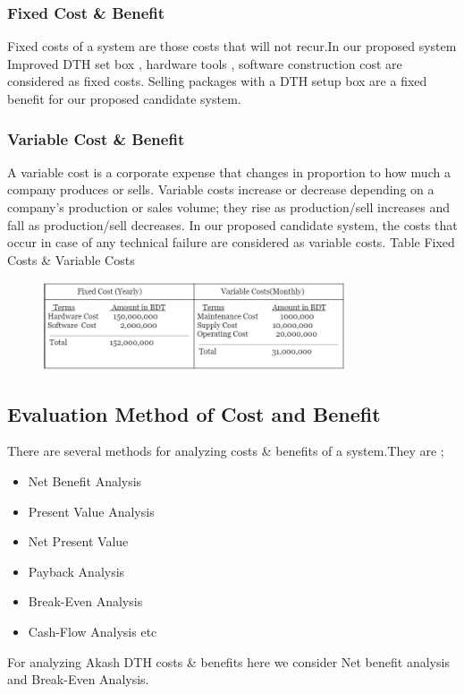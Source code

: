 \begin{spacing}{1}
\subsubsection {Fixed Cost \& Benefit}
Fixed costs of a system are those costs that will not recur.In our proposed system Improved DTH set box , hardware tools , software construction cost are considered as fixed costs. Selling packages with a DTH setup box are a fixed benefit for our proposed candidate system. 

\subsubsection {Variable Cost \& Benefit}
A variable cost is a corporate expense that changes in proportion to how much a company produces or sells. Variable costs increase or decrease depending on a company's production or sales volume; they rise as production/sell increases and fall as production/sell decreases. In our proposed candidate system, the costs that occur in case of any technical failure are considered as variable costs. 
Table Fixed Costs \& Variable Costs 
\begin{figure}[H]
	\centering
	\includegraphics[width=0.8\textwidth]{cost}
	\label{fig:cost}
\end{figure}

\subsection{Evaluation Method of Cost and Benefit }
There are several methods for analyzing costs & benefits of a system.They are ; 
\begin {itemize}
\item Net Benefit Analysis
\item Present Value Analysis
\item Net Present Value
\item Payback Analysis
\item Break-Even Analysis
\item Cash-Flow Analysis etc
\end {itemize}
For analyzing Akash DTH costs & benefits here we consider Net benefit analysis and Break-Even Analysis.


\end{spacing}
